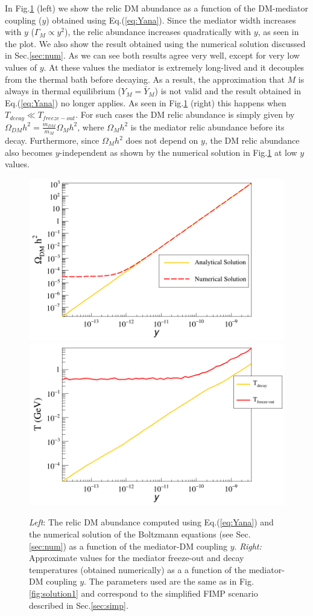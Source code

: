\documentclass{article}
\begin{document}
In Fig.\ref{fig:solution2} (left) we show the relic DM abundance as a function of the DM-mediator coupling ($y$)
obtained using Eq.(\ref{eq:Yana}). Since the mediator width increases with $y$ ($\Gamma_M \propto y^2$),
the relic abundance increases quadratically with $y$, as seen in the plot.
We also show the result obtained using the numerical solution discussed in
Sec.\ref{sec:num}.
As we can see both results agree very well, except for very low values of $y$.
At these values the mediator is extremely long-lived and it decouples from the thermal
bath before decaying. As a result, the approximation that $M$ is always in thermal equilibrium ($Y_M = \bar{Y}_M$)
is not valid and the result obtained in Eq.(\ref{eq:Yana}) no longer applies.
As seen in Fig.\ref{fig:solution2} (right) this happens when $T_{decay} \ll T_{freeze-out}$.
For such cases the DM relic abundance is simply given by $\Omega_{DM} h^2 = \frac{m_{DM}}{m_M} \Omega_{M} h^2$,
where $\Omega_{M} h^2$ is the mediator relic abundance before its decay.
Furthermore, since $\Omega_{M} h^2$ does not depend on $y$, the DM relic abundance
also becomes $y$-independent as shown by the numerical solution in Fig.\ref{fig:solution2} at low
$y$ values.


\begin{figure}
\includegraphics[width=0.5\linewidth,clip]{scan1.png}
\includegraphics[width=0.5\linewidth,clip]{scan2.png}
\caption{{\it Left}: The relic DM abundance computed using Eq.(\ref{eq:Yana}) and the
numerical solution of the Boltzmann equations (see Sec.\ref{sec:num}) as a function of
the mediator-DM coupling $y$.
{\it Right:} Approximate values for the mediator freeze-out and decay
temperatures (obtained numerically) as a a function of the mediator-DM coupling $y$.
The parameters used are the same as in Fig.\ref{fig:solution1} and correspond to the simplified FIMP scenario described in Sec.\ref{sec:simp}.
 \label{fig:solution2}}
\end{figure}
\end{document}
